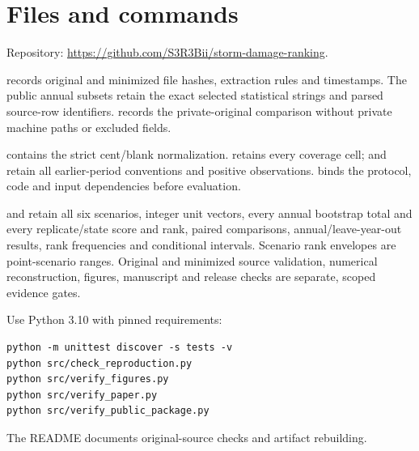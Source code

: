 \documentclass[11pt,letterpaper]{article}
\begin{document}
\normalsize
\section*{Files and commands}
Repository: \url{https://github.com/S3R3Bii/storm-damage-ranking}.

 records original and minimized file hashes, extraction rules and timestamps. The public annual subsets retain the exact selected statistical strings and parsed source-row identifiers.  records the private-original comparison without private machine paths or excluded fields.

 contains the strict cent/blank normalization.  retains every coverage cell;  and  retain all earlier-period conventions and positive observations.  binds the protocol, code and input dependencies before evaluation.

 and  retain all six scenarios, integer unit vectors, every annual bootstrap total and every replicate/state score and rank, paired comparisons, annual/leave-year-out results, rank frequencies and conditional intervals. Scenario rank envelopes are point-scenario ranges. Original and minimized source validation, numerical reconstruction, figures, manuscript and release checks are separate, scoped evidence gates.

Use Python 3.10 with pinned requirements:
{\small
\begin{verbatim}
python -m unittest discover -s tests -v
python src/check_reproduction.py
python src/verify_figures.py
python src/verify_paper.py
python src/verify_public_package.py
\end{verbatim}
}
The README documents original-source checks and artifact rebuilding.
\end{document}
